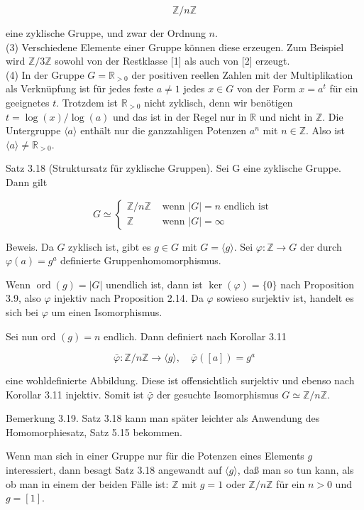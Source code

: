 \documentclass[10pt, letterpaper]{article}
\begin{document}
$$
\mathbb{Z} / n \mathbb{Z}
$$

eine zyklische Gruppe, und zwar der Ordnung $n$.\\
(3) Verschiedene Elemente einer Gruppe können diese erzeugen. Zum Beispiel wird $\mathbb{Z} / 3 \mathbb{Z}$ sowohl von der Restklasse [1] als auch von [2] erzeugt.\\
(4) In der Gruppe $G=\mathbb{R}_{>0}$ der positiven reellen Zahlen mit der Multiplikation als Verknüpfung ist für jedes feste $a \neq 1$ jedes $x \in G$ von der Form $x=a^{t}$ für ein geeignetes $t$. Trotzdem ist $\mathbb{R}_{>0}$ nicht zyklisch, denn wir benötigen $t=\log (x) / \log (a)$ und das ist in der Regel nur in $\mathbb{R}$ und nicht in $\mathbb{Z}$. Die Untergruppe $\langle a\rangle$ enthält nur die ganzzahligen Potenzen $a^{n}$ mit $n \in \mathbb{Z}$. Also ist $\langle a\rangle \neq \mathbb{R}_{>0}$.

Satz 3.18 (Struktursatz für zyklische Gruppen). Sei G eine zyklische Gruppe. Dann gilt

$$
G \simeq \begin{cases}\mathbb{Z} / n \mathbb{Z} & \text { wenn }|G|=n \text { endlich ist } \\ \mathbb{Z} & \text { wenn }|G|=\infty\end{cases}
$$

Beweis. Da $G$ zyklisch ist, gibt es $g \in G$ mit $G=\langle g\rangle$. Sei $\varphi: \mathbb{Z} \rightarrow G$ der durch $\varphi(a)=g^{a}$ definierte Gruppenhomomorphismus.

Wenn $\operatorname{ord}(g)=|G|$ unendlich ist, dann ist $\operatorname{ker}(\varphi)=\{0\}$ nach Proposition 3.9, also $\varphi$ injektiv nach Proposition 2.14. Da $\varphi$ sowieso surjektiv ist, handelt es sich bei $\varphi$ um einen Isomorphismus.

Sei nun ord $(g)=n$ endlich. Dann definiert nach Korollar 3.11

$$
\bar{\varphi}: \mathbb{Z} / n \mathbb{Z} \rightarrow\langle g\rangle, \quad \bar{\varphi}([a])=g^{a}
$$

eine wohldefinierte Abbildung. Diese ist offensichtlich surjektiv und ebenso nach Korollar 3.11 injektiv. Somit ist $\bar{\varphi}$ der gesuchte Isomorphismus $G \simeq \mathbb{Z} / n \mathbb{Z}$.

Bemerkung 3.19. Satz 3.18 kann man später leichter als Anwendung des Homomorphiesatz, Satz 5.15 bekommen.

Wenn man sich in einer Gruppe nur für die Potenzen eines Elements $g$ interessiert, dann besagt Satz 3.18 angewandt auf $\langle g\rangle$, daß man so tun kann, als ob man in einem der beiden Fälle ist: $\mathbb{Z}$ mit $g=1$ oder $\mathbb{Z} / n \mathbb{Z}$ für ein $n>0$ und $g=[1]$.
\end{document}
